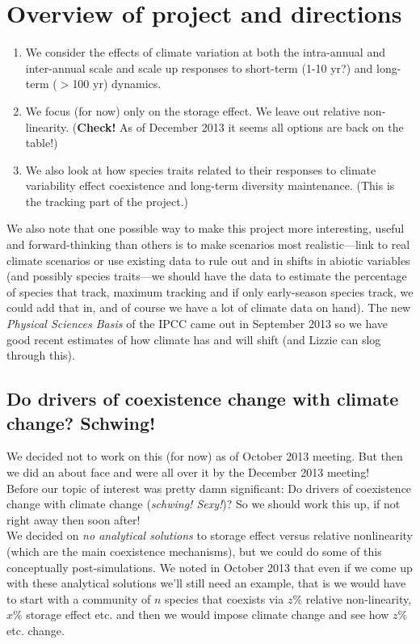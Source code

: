 \documentclass[11pt,a4paper,oneside]{article}
\begin{document}
\section{Overview of project and directions}
\noindent 
\begin{enumerate}
\item We consider the effects of climate variation at both the
intra-annual and inter-annual scale and scale up responses to
short-term (1-10 yr?) and long-term (\(>\)100 yr) dynamics. 
\item We focus (for now) only on the storage effect. We leave out relative non-linearity. ({\bf Check!} As of December 2013 it seems all options are back on the table!)
\item We also look at how species traits related to their responses to
  climate variability effect coexistence and long-term diversity
  maintenance. (This is the tracking part of the project.) 
\end{enumerate}

\noindent We also note that one possible way to make this project more
interesting, useful and forward-thinking than others is to make
scenarios most realistic---link to real climate scenarios or use
existing data to rule out and in shifts in abiotic variables (and
possibly species traits---we should have the data to estimate the
percentage of species that track, maximum tracking and if only
early-season species track, we could add that in, and of course we
have a lot of climate data on hand). The new \emph{Physical Sciences Basis} of the IPCC came out in September 2013 so we have good recent estimates of how climate has and will shift (and Lizzie can slog through this).

\subsection{Do drivers of coexistence change with climate change? Schwing!}
\noindent We decided not to work on this (for now) as of October 2013 meeting. But then we did an about face and were all over it by the December 2013 meeting!\\

 Before our topic of interest was pretty damn significant: Do drivers of coexistence change with climate change (\emph{schwing! Sexy!})? So we should work this up, if not right away then soon after!\\

We decided on \emph{no analytical solutions} to storage effect versus relative nonlinearity (which are the main coexistence mechanisms), but we could do some of this conceptually post-simulations. We noted in October 2013 that even if we come up with these analytical solutions we'll still need an example, that is we would have to start with a community of \(n\) species that coexists via \(z\%\) relative non-linearity, \(x\%\) storage effect etc. and then we would impose climate change and see how \(z\%\) etc. change.\\
\end{document}
